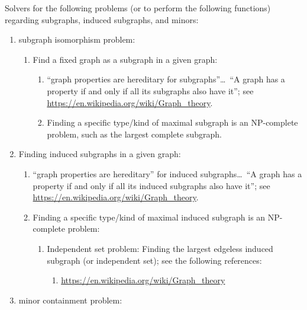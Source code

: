 Solvers for the following problems (or to perform the following functions) regarding subgraphs, induced subgraphs, and minors: \vspace{-0.3cm}
\begin{enumerate} \itemsep -4pt
\item subgraph isomorphism problem: \vspace{-0.3cm}
	\begin{enumerate} \itemsep -2pt
	\item Find a fixed graph as a subgraph in a given graph: \vspace{-0.2cm}
		\begin{enumerate} \itemsep -2pt
		\item ``graph properties are hereditary for subgraphs''\dots\ ``A graph has a property if and only if all its subgraphs also have it''; see \url{https://en.wikipedia.org/wiki/Graph_theory}.
		\item Finding a specific type/kind of maximal subgraph is an NP-complete problem, such as the largest complete subgraph.
		\end{enumerate}
	\end{enumerate}
\item Finding induced subgraphs in a given graph: \vspace{-0.3cm}
	\begin{enumerate} \itemsep -2pt
	\item ``graph properties are hereditary'' for induced subgraphs\dots\ ``A graph has a property if and only if all its induced subgraphs also have it''; see \url{https://en.wikipedia.org/wiki/Graph_theory}.
	\item Finding a specific type/kind of maximal induced subgraph is an NP-complete problem: \vspace{-0.2cm}
		\begin{enumerate} \itemsep -2pt
		\item Independent set problem: Finding the largest edgeless induced subgraph (or independent set); see the following references: \vspace{-0.1cm}
			\begin{enumerate} \itemsep -1pt
			\item \url{https://en.wikipedia.org/wiki/Graph_theory}
			\end{enumerate}
		\end{enumerate}
	\end{enumerate}
\item minor containment problem: \vspace{-0.3cm}

\end{enumerate}
